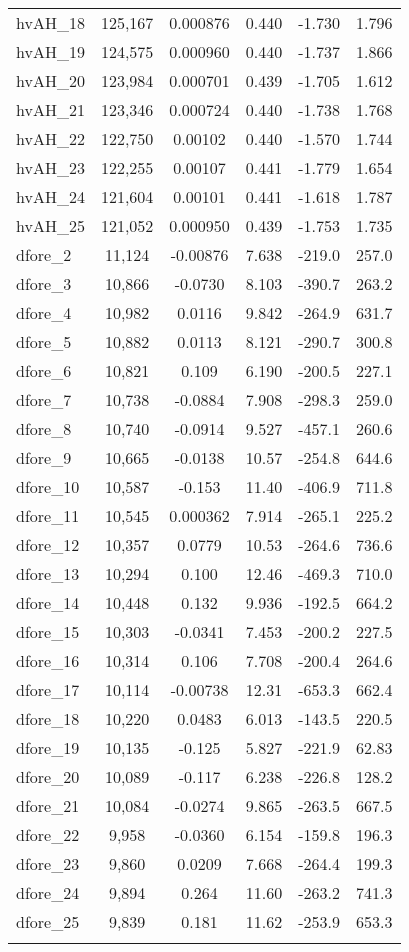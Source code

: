 \begin{tabular}{lccccc}
hvAH\_18 & 125,167 & 0.000876 & 0.440 & -1.730 & 1.796 \\
hvAH\_19 & 124,575 & 0.000960 & 0.440 & -1.737 & 1.866 \\
hvAH\_20 & 123,984 & 0.000701 & 0.439 & -1.705 & 1.612 \\
hvAH\_21 & 123,346 & 0.000724 & 0.440 & -1.738 & 1.768 \\
hvAH\_22 & 122,750 & 0.00102 & 0.440 & -1.570 & 1.744 \\
hvAH\_23 & 122,255 & 0.00107 & 0.441 & -1.779 & 1.654 \\
hvAH\_24 & 121,604 & 0.00101 & 0.441 & -1.618 & 1.787 \\
hvAH\_25 & 121,052 & 0.000950 & 0.439 & -1.753 & 1.735 \\
dfore\_2 & 11,124 & -0.00876 & 7.638 & -219.0 & 257.0 \\
dfore\_3 & 10,866 & -0.0730 & 8.103 & -390.7 & 263.2 \\
dfore\_4 & 10,982 & 0.0116 & 9.842 & -264.9 & 631.7 \\
dfore\_5 & 10,882 & 0.0113 & 8.121 & -290.7 & 300.8 \\
dfore\_6 & 10,821 & 0.109 & 6.190 & -200.5 & 227.1 \\
dfore\_7 & 10,738 & -0.0884 & 7.908 & -298.3 & 259.0 \\
dfore\_8 & 10,740 & -0.0914 & 9.527 & -457.1 & 260.6 \\
dfore\_9 & 10,665 & -0.0138 & 10.57 & -254.8 & 644.6 \\
dfore\_10 & 10,587 & -0.153 & 11.40 & -406.9 & 711.8 \\
dfore\_11 & 10,545 & 0.000362 & 7.914 & -265.1 & 225.2 \\
dfore\_12 & 10,357 & 0.0779 & 10.53 & -264.6 & 736.6 \\
dfore\_13 & 10,294 & 0.100 & 12.46 & -469.3 & 710.0 \\
dfore\_14 & 10,448 & 0.132 & 9.936 & -192.5 & 664.2 \\
dfore\_15 & 10,303 & -0.0341 & 7.453 & -200.2 & 227.5 \\
dfore\_16 & 10,314 & 0.106 & 7.708 & -200.4 & 264.6 \\
dfore\_17 & 10,114 & -0.00738 & 12.31 & -653.3 & 662.4 \\
dfore\_18 & 10,220 & 0.0483 & 6.013 & -143.5 & 220.5 \\
dfore\_19 & 10,135 & -0.125 & 5.827 & -221.9 & 62.83 \\
dfore\_20 & 10,089 & -0.117 & 6.238 & -226.8 & 128.2 \\
dfore\_21 & 10,084 & -0.0274 & 9.865 & -263.5 & 667.5 \\
dfore\_22 & 9,958 & -0.0360 & 6.154 & -159.8 & 196.3 \\
dfore\_23 & 9,860 & 0.0209 & 7.668 & -264.4 & 199.3 \\
dfore\_24 & 9,894 & 0.264 & 11.60 & -263.2 & 741.3 \\
dfore\_25 & 9,839 & 0.181 & 11.62 & -253.9 & 653.3 \\
 &  &  &  &  &  \\ \hline
\end{tabular}

